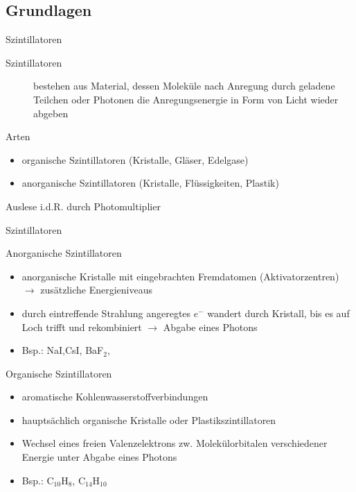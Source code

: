\subsection[]{Grundlagen}

\begin{frame}{Szintillatoren}

\begin{description}
	  \item[Szintillatoren] bestehen aus Material, dessen Moleküle nach Anregung durch geladene
	  Teilchen oder Photonen die Anregungsenergie in Form von Licht wieder abgeben
	\end{description}
	\begin{block}{Arten}
		\begin{itemize}
		  \item organische Szintillatoren (Kristalle, Gläser, Edelgase)
		  \item anorganische Szintillatoren (Kristalle, Flüssigkeiten, Plastik)
		\end{itemize}
	\end{block}
	\vspace{0.7cm}
	Auslese i.d.R. durch Photomultiplier
\end{frame}	


\begin{frame}{Szintillatoren}
	\begin{block}{Anorganische Szintillatoren}
		\begin{itemize}
		  \item anorganische Kristalle mit eingebrachten Fremdatomen (Aktivatorzentren) $\rightarrow$
		  zusätzliche Energieniveaus
		  \item durch eintreffende Strahlung angeregtes $e^-$ wandert durch Kristall, bis es auf Loch
		  trifft und rekombiniert $\rightarrow$ Abgabe eines Photons
		  \item Bsp.: NaI,CsI, BaF$_2$,
		\end{itemize}
	\end{block}
		\begin{block}{Organische Szintillatoren}
		\begin{itemize}
		  \item aromatische Kohlenwasserstoffverbindungen
		  \item hauptsächlich organische Kristalle oder Plastikszintillatoren
		  \item Wechsel eines freien Valenzelektrons zw.
Molekülorbitalen verschiedener Energie unter Abgabe eines Photons
		  \item Bsp.: C$_{10}$H$_8$, C$_{14}$H$_{10}$
		\end{itemize}
	\end{block}
\end{frame}	

